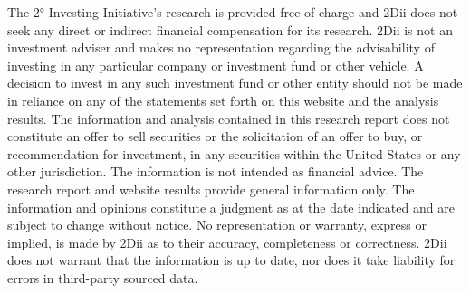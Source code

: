 \documentclass[10pt,table,a4]{article}\usepackage[]{graphicx}\usepackage[]{color}
\begin{document}
\begin{multicols}{2}
		The 2° Investing Initiative’s research is provided free of charge and 2Dii does not seek any direct or indirect financial compensation for its research. 2Dii is not an investment adviser and makes no representation regarding the advisability of investing in any particular company or investment fund or other vehicle. A decision to invest in any such investment fund or other entity should not be made in reliance on any of the statements set forth on this website and the analysis results. The information and analysis contained in this research report does not constitute an offer to sell securities or the solicitation of an offer to buy, or recommendation for investment, in any securities within the United States or any other jurisdiction. The information is not intended as financial advice. The research report and website results provide general information only. The information and opinions constitute a judgment as at the date indicated and are subject to change without notice. No representation or warranty, express or implied, is made by 2Dii as to their accuracy, completeness or correctness. 2Dii does not warrant that the information is up to date, nor does it take liability for errors in third-party sourced data.
	\end{multicols}
	
	\newpage
	
	
\end{document}
